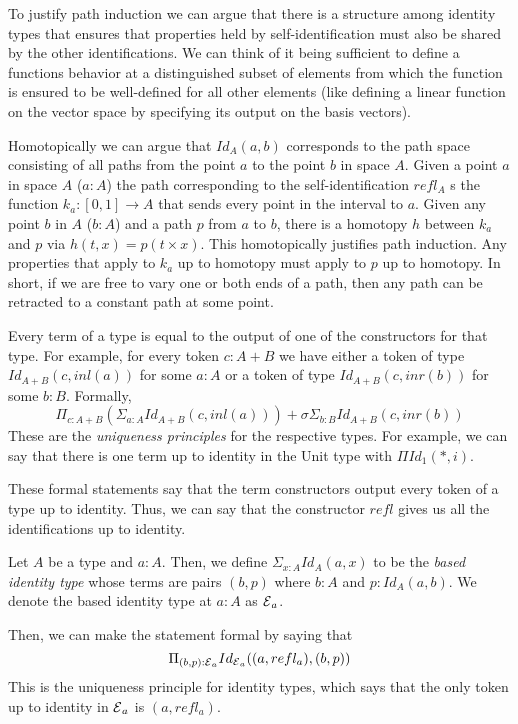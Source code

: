 \documentclass{article}
\begin{document}
To justify path induction we can argue that there is a structure among identity types that ensures that properties held by self-identification must also be shared by the other identifications. We can think of it being sufficient to define a functions behavior at a distinguished subset of elements from which the function is ensured to be well-defined for all other elements (like defining a linear function on the vector space by specifying its output on the basis vectors).

Homotopically we can argue that $Id_{A}(a, b)$ corresponds to the path space consisting of all paths from the point $a$ to the point $b$ in space $A$. Given a point $a$ in space $A$ ($a : A$) the path corresponding to the self-identification $refl_{A}$ s the function $k_{a} : [0, 1] \to A$ that sends every point in the interval to $a$. Given any point $b$ in $A$ ($b : A$) and a path $p$ from $a$ to $b$, there is a homotopy $h$ between $k_{a}$ and $p$ via $h(t, x) = p(t \times x)$. This homotopically justifies path induction. Any properties that apply to $k_{a}$ up to homotopy must apply to $p$ up to homotopy. In short, if we are free to vary one or both ends of a path, then any path can be retracted to a constant path at some point.

Every term of a type is equal to the output of one of the constructors for that type. For example, for every token $c : A + B$ we have either a token of type $Id_{A+B}(c, inl(a))$ for some $a : A$ or a token of type $Id_{A+B}(c, inr(b))$ for some $b : B$. Formally,
\begin{equation*}
\Pi_{c : A + B}(\Sigma_{a : A}Id_{A + B}(c, inl(a))) + \sigma \Sigma_{b : B}Id_{A + B}(c, inr(b))
\end{equation*}
These are the \emph{uniqueness principles} for the respective types. For example, we can say that there is one term up to identity in the Unit type with $\Pi Id_{1}(*, i)$.

These formal statements say that the term constructors output every token of a type up to identity. Thus, we can say that the constructor $refl$ gives us all the identifications up to identity.
\begin{definition}
  Let $A$ be a type and $a : A$. Then, we define $\Sigma_{x : A} Id_{A}(a, x)$ to be the \emph{based identity type} whose terms are pairs $(b, p)$ where $b : A$ and $p : Id_{A}(a, b)$. We denote the based identity type at $a : A$ as $\operatorname{\mathcal{E}}_{a}$.
\end{definition}
Then, we can make the statement formal by saying that
\begin{equation*}
  \Pi_{(b, p) : \operatorname{\mathcal{E}}_{a}} Id_{\operatorname{\mathcal{E}}_{a}}((a, refl_{a}), (b, p))
\end{equation*}
This is the uniqueness principle for identity types, which says that the only token up to identity in $\operatorname{\mathcal{E}}_{a}$ is $(a, refl_{a})$.
\end{document}
